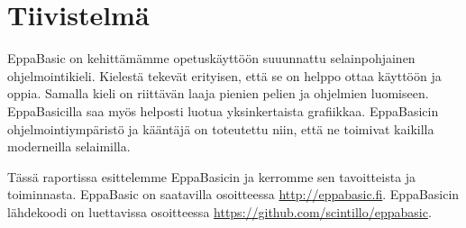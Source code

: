 
\section*{Tiivistelmä}
EppaBasic on kehittämämme opetuskäyttöön suuunnattu
selainpohjainen ohjelmointikieli.
Kielestä tekevät erityisen,
että se on helppo ottaa käyttöön
ja oppia.
Samalla kieli on riittävän
laaja pienien pelien ja ohjelmien luomiseen.
EppaBasicilla saa myös helposti luotua
yksinkertaista grafiikkaa.
EppaBasicin ohjelmointiympäristö ja kääntäjä
on toteutettu niin, että ne toimivat
kaikilla moderneilla selaimilla.

Tässä raportissa esittelemme EppaBasicin
ja kerromme sen tavoitteista ja toiminnasta.
EppaBasic on saatavilla osoitteessa \url{http://eppabasic.fi}.
EppaBasicin lähdekoodi on luettavissa
osoitteessa \url{https://github.com/scintillo/eppabasic}.